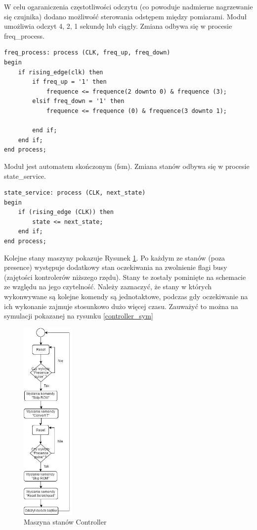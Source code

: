 \documentclass[a4paper]{article}
\begin{document}
W celu ogaraniczenia częstotliwości odczytu (co powoduje nadmierne nagrzewanie się czujnika) dodano możliwość sterowania odstępem między pomiarami. Moduł umożliwia odczyt 4, 2, 1 sekundę lub ciągły. Zmiana odbywa się w procesie freq\_process.

\lstset{language=VHDL}
\begin{lstlisting}[frame=single]
freq_process: process (CLK, freq_up, freq_down)
begin
	if rising_edge(clk) then
		if freq_up = '1' then
			frequence <= frequence(2 downto 0) & frequence (3);
		elsif freq_down = '1' then
			frequence <= frequence (0) & frequence(3 downto 1);

		end if;
	end if;
end process;
\end{lstlisting}

Moduł jest automatem skończonym (fsm). Zmiana stanów odbywa się w procesie  state\_service.

\lstset{language=VHDL}
\begin{lstlisting}[frame=single]
state_service: process (CLK, next_state)
begin
	if (rising_edge (CLK)) then
		state <= next_state;
	end if;
end process;
\end{lstlisting}

Kolejne stany maszyny pokazuje Rysunek \ref{controller_fsm}. Po każdym ze stanów (poza presence) występuje dodatkowy stan oczekiwania na zwolnienie flagi busy (zajętości kontrolerów niższego rzędu). Stany te zostały pominięte na schemacie ze względu na jego czytelność. Należy zaznaczyć, że stany w których wykonwywane są kolejne komendy są jednotaktowe, podczas gdy oczekiwanie na ich wykonanie zajmuje stosunkowo dużo więcej czasu. Zauważyć to można na symulacji pokazanej na rysunku \ref{controller_sym}

\begin{figure}[!h]
\begin{center}
\includegraphics[height=10cm]{graphics/controller_fsm.png}
\end{center}
\caption{Maszyna stanów Controller}
\label{controller_fsm}
\end{figure}
\end{document}
